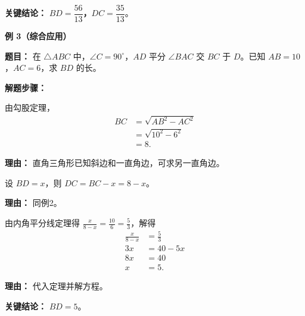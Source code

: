 \begin{examplebox}
	\textbf{\textcolor{CExample}{关键结论：}}
	\textbf{$BD = \dfrac{56}{13}$，$DC = \dfrac{35}{13}$}。

	\medskip
	\textbf{\textcolor{CExample}{例 3（综合应用）}}

	\textbf{\textcolor{CExample}{题目：}}
	在 $\triangle ABC$ 中，$\angle C = 90^\circ$，$AD$ 平分 $\angle BAC$ 交 $BC$ 于 $D$。已知 $AB=10$，$AC=6$，求 $BD$ 的长。

	\textbf{\textcolor{CExample}{解题步骤：}}
	\begin{description}[style=nextline, leftmargin=2.8em, labelsep=0.5em, itemsep=0.45em]
		\item[\textbf{第一步（勾股求边）：}] 由勾股定理，
			\[
				\begin{aligned}
					BC &= \sqrt{AB^2 - AC^2} \\
					&= \sqrt{10^2 - 6^2} \\
					&= 8.
			\end{aligned}
			\]
			\par\textbf{理由：} 直角三角形已知斜边和一直角边，可求另一直角边。

		\item[\textbf{第二步（设未知量）：}] 设 $BD=x$，则 $DC=BC-x=8-x$。
			\par\textbf{理由：} 同例2。

		\item[\textbf{第三步（比例求解）：}] 由内角平分线定理得 $\frac{x}{8-x} = \frac{10}{6} = \frac{5}{3}$，解得
			\[
				\begin{aligned}
					\frac{x}{8-x} &= \frac{5}{3} \\
					3x &= 40 - 5x \\
					8x &= 40 \\
					x &= 5.
			\end{aligned}
			\]
			\par\textbf{理由：} 代入定理并解方程。
	\end{description}

	\textbf{\textcolor{CExample}{关键结论：}}
	\textbf{$BD=5$}。
\end{examplebox}
